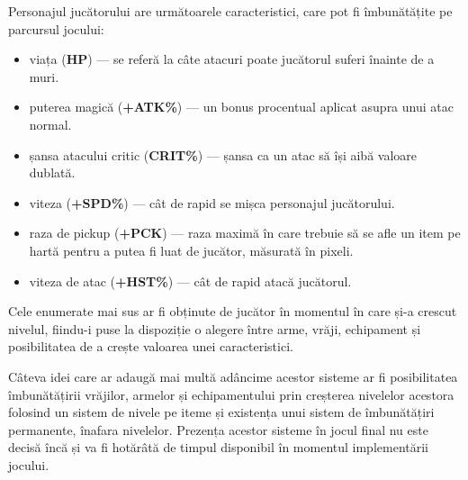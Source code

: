 \documentclass{article}
\begin{document}
    Personajul jucătorului are următoarele caracteristici, care pot fi îmbunătățite pe parcursul
    jocului:
    \begin{itemize} \label{sec:stats}
        \item viața (\textbf{HP}) --- se referă la câte atacuri poate jucătorul suferi înainte de a muri.
        \item puterea magică (\textbf{+ATK\%}) --- un bonus procentual aplicat asupra unui atac normal.
        \item șansa atacului critic (\textbf{CRIT\%}) --- șansa ca un atac să își aibă valoare dublată.
        \item viteza (\textbf{+SPD\%}) --- cât de rapid se mișca personajul jucătorului.
        \item raza de pickup (\textbf{+PCK}) --- raza maximă în care trebuie să se afle un item
        pe hartă pentru a putea fi luat de jucător, măsurată în pixeli.
        \item viteza de atac (\textbf{+HST\%}) --- cât de rapid atacă jucătorul.
    \end{itemize}
    \label{sec:pcs}

    Cele enumerate mai sus ar fi obținute de jucător în momentul în care și-a crescut nivelul,
    fiindu-i puse la dispoziție o alegere între arme, vrăji, echipament și posibilitatea de a
    crește valoarea unei caracteristici.

    \label{sec:exts}
    Câteva idei care ar adaugă mai multă adâncime acestor sisteme ar fi posibilitatea îmbunătățirii
    vrăjilor, armelor și echipamentului prin creșterea nivelelor acestora folosind un sistem de
    nivele pe iteme și existența unui sistem de îmbunătățiri permanente, înafara nivelelor.
    Prezența acestor sisteme în jocul final nu este decisă încă și va fi hotărâtă de timpul
    disponibil în momentul implementării jocului.
\end{document}
